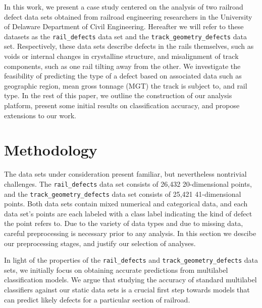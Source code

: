 \documentclass{sig-alternate-05-2015}
\begin{document}
In this work, we present a case study centered on the analysis of two railroad defect data sets
obtained from railroad engineering researchers in the University of Delaware Department of 
Civil Engineering. Hereafter we will refer to these datasets as the \texttt{rail\_defects} data 
set and the \texttt{track\_geometry\_defects} data set. Respectively, these data sets describe 
defects in the rails themselves, such as voids or internal changes in crystalline structure, 
and misalignment of track components, such as one rail tilting away from the other. We 
investigate the feasibility of predicting the type of a defect based on associated data such 
as geographic region, mean gross tonnage (MGT) the track is subject to, and rail type. 
In the rest of this paper, we outline the construction of our analysis platform, present some
initial results on classification accuracy, and propose extensions to our work. 

\section{Methodology}
The data sets under consideration present familiar, but nevertheless nontrivial challenges. The 
\texttt{rail\_defects} data set consists of 26,432 20-dimensional points, and the 
\texttt{track\_geometry\_defects} data set consists of 25,421 41-dimensional points. 
Both data sets contain mixed numerical and categorical data, and each data set's points are
each labeled with a class label indicating the kind of defect the point refers to. 
Due to the variety of data types and due to missing data, careful preprocessing is necessary
prior to any analysis. In this section we descibe our preprocessing stages, and justify our
selection of analyses. 

In light of the properties of the \texttt{rail\_defects} and 
\texttt{track\_geometry\_defects} data sets, we initially focus on obtaining accurate 
predictions from multilabel classification models. We argue that studying the accuracy of
standard multilabel classifiers against our static data sets is a crucial first step towards
models that can predict likely defects for a particular section of railroad. 
\end{document}
